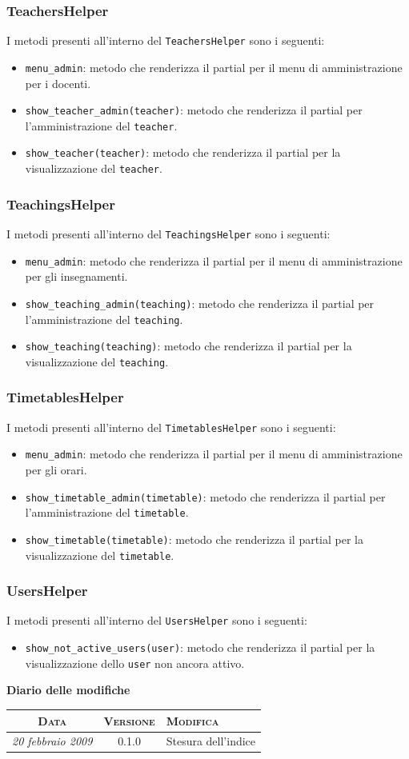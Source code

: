 \documentclass[11pt,a4paper]{article}
\newcommand{\modifiche} 
{
\newpage
\begin{center}
\textbf{Diario delle modifiche} \\
\bigskip
\begin{tabular}{|c|c|p{0.51\textwidth}|}
\hline
\textsc{Data} & \textsc{Versione} & \textsc{Modifica} \\
\hline
\hline
\textit{20 febbraio 2009} & 0.1.0 & Stesura dell'indice \\
\hline
\end{tabular}
\end{center}
}
\begin{document}
\subsubsection{TeachersHelper}
I metodi presenti all'interno del \verb|TeachersHelper| sono i seguenti:
\begin{itemize}
 \item \verb|menu_admin|: metodo che renderizza il partial per il menu di amministrazione per i docenti.
 \item \verb|show_teacher_admin(teacher)|: metodo che renderizza il partial per l'amministrazione del \verb|teacher|.
 \item \verb|show_teacher(teacher)|: metodo che renderizza il partial per la visualizzazione del \verb|teacher|.
\end{itemize}
\subsubsection{TeachingsHelper}
I metodi presenti all'interno del \verb|TeachingsHelper| sono i seguenti:
\begin{itemize}
 \item \verb|menu_admin|: metodo che renderizza il partial per il menu di amministrazione per gli insegnamenti.
 \item \verb|show_teaching_admin(teaching)|: metodo che renderizza il partial per l'amministrazione del \verb|teaching|.
 \item \verb|show_teaching(teaching)|: metodo che renderizza il partial per la visualizzazione del \verb|teaching|.
\end{itemize}
\subsubsection{TimetablesHelper}
I metodi presenti all'interno del \verb|TimetablesHelper| sono i seguenti:
\begin{itemize}
 \item \verb|menu_admin|: metodo che renderizza il partial per il menu di amministrazione per gli orari.
 \item \verb|show_timetable_admin(timetable)|: metodo che renderizza il partial per l'amministrazione del \verb|timetable|.
 \item \verb|show_timetable(timetable)|: metodo che renderizza il partial per la visualizzazione del \verb|timetable|.
\end{itemize}
\subsubsection{UsersHelper}
I metodi presenti all'interno del \verb|UsersHelper| sono i seguenti:
\begin{itemize}
 \item \verb|show_not_active_users(user)|: metodo che renderizza il partial per la visualizzazione dello \verb|user| non ancora attivo.
\end{itemize} 
\modifiche
\end{document}
